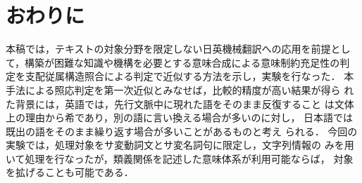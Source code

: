 \section{おわりに}

本稿では，テキストの対象分野を限定しない日英機械翻訳への応用を前提とし
て，構築が困難な知識や機構を必要とする意味合成による意味制約充足性の判
定を支配従属構造照合による判定で近似する方法を示し，実験を行なった．
本手法による照応判定を第一次近似とみなせば，比較的精度が高い結果が得ら
れた背景には，英語では，先行文脈中に現れた語をそのまま反復すること
は文体上の理由から希であり，別の語に言い換える場合が多いのに対し，
日本語では既出の語をそのまま繰り返す場合が多いことがあるものと考え
られる．
今回の実験では，処理対象をサ変動詞文とサ変名詞句に限定し，文字列情報の
みを用いて処理を行なったが，類義関係を記述した意味体系が利用可能ならば，
対象を拡げることも可能である．

